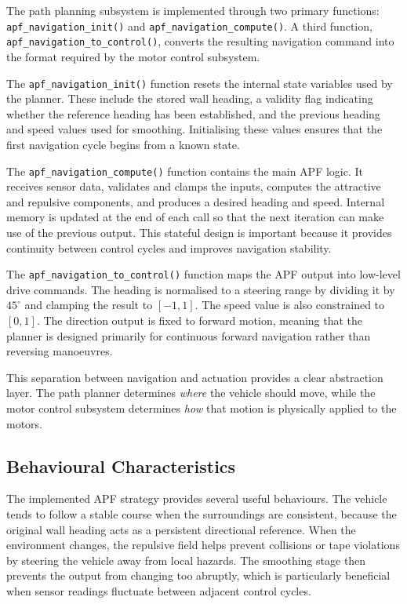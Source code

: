 The path planning subsystem is implemented through two primary functions: \texttt{apf\_navigation\_init()} and \texttt{apf\_navigation\_compute()}. A third function, \texttt{apf\_navigation\_to\_control()}, converts the resulting navigation command into the format required by the motor control subsystem.

The \texttt{apf\_navigation\_init()} function resets the internal state variables used by the planner. These include the stored wall heading, a validity flag indicating whether the reference heading has been established, and the previous heading and speed values used for smoothing. Initialising these values ensures that the first navigation cycle begins from a known state.

The \texttt{apf\_navigation\_compute()} function contains the main APF logic. It receives sensor data, validates and clamps the inputs, computes the attractive and repulsive components, and produces a desired heading and speed. Internal memory is updated at the end of each call so that the next iteration can make use of the previous output. This stateful design is important because it provides continuity between control cycles and improves navigation stability.

The \texttt{apf\_navigation\_to\_control()} function maps the APF output into low-level drive commands. The heading is normalised to a steering range by dividing it by $45^\circ$ and clamping the result to $[-1,1]$. The speed value is also constrained to $[0,1]$. The direction output is fixed to forward motion, meaning that the planner is designed primarily for continuous forward navigation rather than reversing manoeuvres.

This separation between navigation and actuation provides a clear abstraction layer. The path planner determines \emph{where} the vehicle should move, while the motor control subsystem determines \emph{how} that motion is physically applied to the motors.

\subsection{Behavioural Characteristics}

The implemented APF strategy provides several useful behaviours. The vehicle tends to follow a stable course when the surroundings are consistent, because the original wall heading acts as a persistent directional reference. When the environment changes, the repulsive field helps prevent collisions or tape violations by steering the vehicle away from local hazards. The smoothing stage then prevents the output from changing too abruptly, which is particularly beneficial when sensor readings fluctuate between adjacent control cycles.

